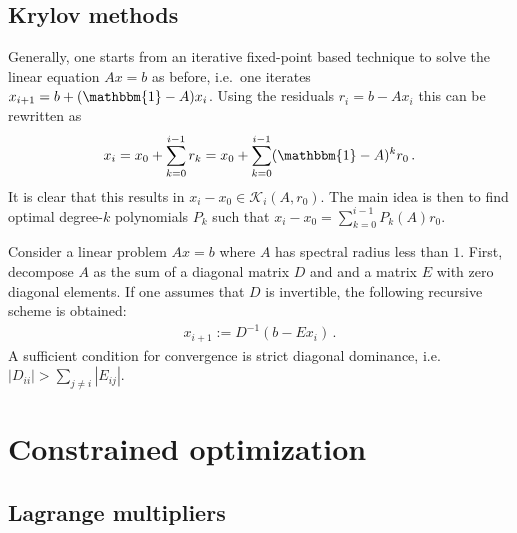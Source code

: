 \subsection{Krylov methods}

    Generally, one starts from an iterative fixed-point based technique to solve the linear equation $Ax=b$ as before, i.e.~one iterates $x_{i+1} = b + (\mathbbm{1}-A)x_i$. Using the residuals $r_i = b - Ax_i$ this can be rewritten as
    \begin{gather}
        x_i = x_0 + \sum_{k=0}^{i-1}r_k = x_0 + \sum_{k=0}^{i-1}(\mathbbm{1}-A)^kr_0\,.
    \end{gather}
    It is clear that this results in $x_i-x_0\in\mathcal{K}_i(A,r_0)$. The main idea is then to find optimal degree-$k$ polynomials $P_k$ such that $x_i-x_0=\sum_{k=0}^{i-1}P_k(A)r_0$.

    \begin{method}
        Consider a linear problem $Ax=b$ where $A$ has spectral radius less than $1$. First, decompose $A$ as the sum of a diagonal matrix $D$ and and a matrix $E$ with zero diagonal elements. If one assumes that $D$ is invertible, the following recursive scheme is obtained:
        \begin{gather}
            x_{i+1} := D^{-1}(b-Ex_i)\,.
        \end{gather}
        A sufficient condition for convergence is strict diagonal dominance, i.e.~$|D_{ii}|>\sum_{j\neq i}|E_{ij}|$.
    \end{method}


\section{Constrained optimization}
\subsection{Lagrange multipliers}

